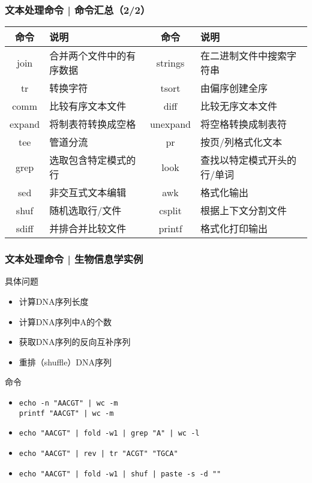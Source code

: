\begin{frame}
  \frametitle{文本处理命令 | 命令汇总（2/2）}
  \begin{table}
    \centering
    \begin{tabularx}{\textwidth}{cX|cX}
      \hline
      \rowcolor{blue!50}命令 & 说明 & 命令 & 说明\\
      \hline
      join & 合并两个文件中的有序数据 & strings & 在二进制文件中搜索字符串\\
      tr & 转换字符 & tsort & 由偏序创建全序\\
      comm & 比较有序文本文件 & diff & 比较无序文本文件\\
      expand & 将制表符转换成空格 & unexpand & 将空格转换成制表符\\
      tee & 管道分流 & pr & 按页/列格式化文本\\
      grep & 选取包含特定模式的行 & look & 查找以特定模式开头的行/单词\\
      sed & 非交互式文本编辑 & awk & 格式化输出\\
      shuf & 随机选取行/文件 & csplit & 根据上下文分割文件\\
      sdiff & 并排合并比较文件 & printf & 格式化打印输出\\
      \hline
    \end{tabularx}
  \end{table}
\end{frame}

\begin{frame}[fragile]
  \frametitle{文本处理命令 | \alert{生物信息学实例}}
  \begin{block}{具体问题}
    \begin{itemize}
      \item<2-> 计算DNA序列长度
      \item<4-> 计算DNA序列中A的个数
      \item<6-> 获取DNA序列的反向互补序列
      \item<8-> 重排（shuffle）DNA序列
    \end{itemize}
  \end{block}
  \begin{block}{命令}
    \begin{itemize}
      \item<3-> \verb=echo -n "AACGT" | wc -m= \\ \verb=printf "AACGT" | wc -m=
      \item<5-> \verb=echo "AACGT" | fold -w1 | grep "A" | wc -l=
      \item<7-> \verb=echo "AACGT" | rev | tr "ACGT" "TGCA"=
      \item<9-> \verb=echo "AACGT" | fold -w1 | shuf | paste -s -d ""=
    \end{itemize}
  \end{block}
\end{frame}

